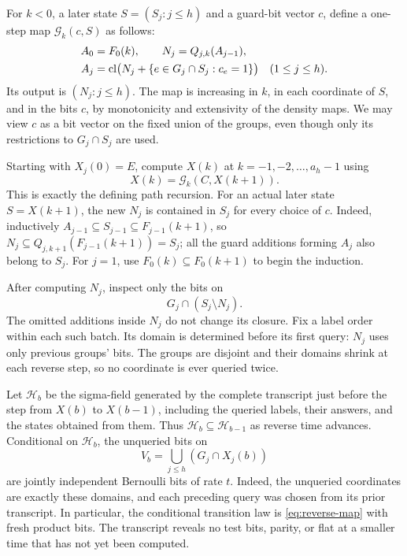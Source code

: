 For $k<0$, a later state $S=(S_j:j\le h)$ and a guard-bit vector $c$,
define a one-step map $\mathcal G_k(c,S)$ as follows:
\begin{equation}\label{eq:reverse-map}
 \begin{aligned}
 A_0&=F_0(k),\qquad N_j=Q_{j,k}(A_{j-1}),\\
 A_j&=\operatorname{cl}\bigl(N_j+\{e\in G_j\cap S_j:c_e=1\}\bigr)
       \quad(1\le j\le h).
 \end{aligned}
\end{equation}
Its output is $(N_j:j\le h)$. The map is increasing in $k$, in each
coordinate of $S$, and in the bits $c$, by monotonicity and extensivity of
the density maps. We may view $c$ as a bit vector on the fixed union of
the groups, even though only its restrictions to $G_j\cap S_j$ are used.

Starting with $X_j(0)=E$, compute $X(k)$ at
$k=-1,-2,\ldots,a_h-1$ using
\[
 X(k)=\mathcal G_k(C,X(k+1)).
\]
This is exactly the defining path recursion. For an actual later state
$S=X(k+1)$, the new $N_j$ is contained in $S_j$ for every choice of $c$.
Indeed, inductively $A_{j-1}\subseteq S_{j-1}\subseteq F_{j-1}(k+1)$,
so $N_j\subseteq Q_{j,k+1}(F_{j-1}(k+1))=S_j$; all the guard additions
forming $A_j$ also belong to $S_j$. For $j=1$, use
$F_0(k)\subseteq F_0(k+1)$ to begin the induction.

After computing $N_j$, inspect only the bits on
\begin{equation}\label{eq:departing-query}
 G_j\cap(S_j\setminus N_j).
\end{equation}
The omitted additions inside $N_j$ do not change its closure. Fix a label
order within each such batch. Its domain is determined before its first
query: $N_j$ uses only previous groups' bits. The groups are disjoint and
their domains shrink at each reverse step, so no coordinate is ever
queried twice.

Let $\mathcal H_b$ be the sigma-field generated by the complete transcript
just before the step from $X(b)$ to $X(b-1)$, including the queried labels,
their answers, and the states obtained from them. Thus
$\mathcal H_b\subseteq\mathcal H_{b-1}$ as reverse time advances.
Conditional on $\mathcal H_b$, the unqueried bits on
\[
 V_b=\bigcup_{j\le h}(G_j\cap X_j(b))
\]
are jointly independent Bernoulli bits of rate $t$. Indeed, the
unqueried coordinates are exactly these domains, and each preceding
query was chosen from its prior transcript. In particular, the
conditional transition law is \eqref{eq:reverse-map} with fresh product
bits. The transcript reveals no test bits, parity, or flat at a smaller
time that has not yet been computed.

